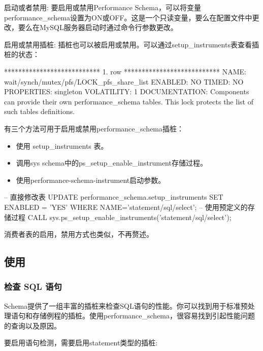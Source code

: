 启动或者禁用: 要启用或禁用Performance Schema，可以将变量performance\_schema设置为ON或OFF。这是一个只读变量，要么在配置文件中更改，要么在MySQL服务器启动时通过命令行参数更改。

启用或禁用插桩: 插桩也可以被启用或禁用。可以通过setup\_instruments表查看插桩的状态：

\begin{bash}
*************************** 1. row ***************************
    NAME: wait/synch/mutex/pfs/LOCK_pfs_share_list
 ENABLED: NO
   TIMED: NO
PROPERTIES: singleton
VOLATILITY: 1
DOCUMENTATION: Components can provide their own performance_schema tables. This lock protects the list of such tables definitions.
\end{bash}

有三个方法可用于启用或禁用performance\_schema插桩：
\begin{itemize}
    \item 使用 setup\_instruments 表。
    \item 调用sys schema中的ps\_setup\_enable\_instrument存储过程。
    \item 使用performance-schema-instrument启动参数。
\end{itemize}

\begin{sql}
-- 直接修改表
UPDATE performance_schema.setup_instruments SET ENABLED = 'YES' WHERE NAME='statement/sql/select';
-- 使用预定义的存储过程
CALL sys.ps_setup_enable_instruments('statement/sql/select');
\end{sql}

消费者表的启用，禁用方式也类似，不再赘述。

\subsection{使用}

\subsubsection*{检查 SQL 语句}

Schema提供了一组丰富的插桩来检查SQL语句的性能。你可以找到用于标准预处理语句和存储例程的插桩。使用performance\_schema，很容易找到引起性能问题的查询以及原因。

要启用语句检测，需要启用statement类型的插桩:

